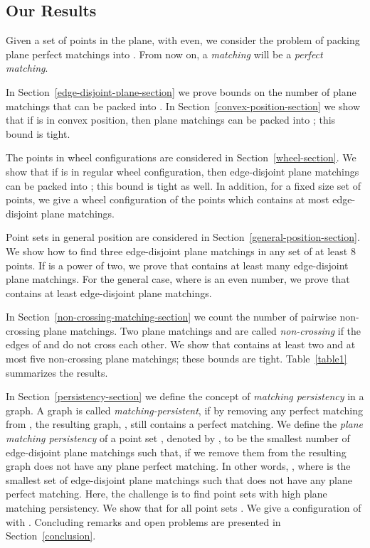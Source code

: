 \documentclass[11pt,a4paper]{article}
\begin{document}
\subsection{Our Results}
\label{our-results-section}

Given a set  of  points in the plane, with  even, we consider the problem of packing plane perfect matchings into . 
From now on, a {\em matching} will be a {\em perfect matching}. 

In Section~\ref{edge-disjoint-plane-section} we prove bounds on the number of plane matchings that can be packed into . 
In Section~\ref{convex-position-section} we show that if  is in convex position, then  plane matchings can be packed into ; this bound is tight. 

The points in wheel configurations are considered in Section~\ref{wheel-section}. We show that if  is in regular wheel configuration, then  edge-disjoint plane matchings can be packed into ; this bound is tight as well. In addition, for a fixed size set of points, we give a wheel configuration of the points which contains at most  edge-disjoint plane matchings. 

Point sets in general position are considered in Section~\ref{general-position-section}. We show how to find three edge-disjoint plane matchings in any set of at least 8 points. If  is a power of two, we prove that  contains at least  many edge-disjoint plane matchings. For the general case, where  is an even number, we prove that  contains at least  edge-disjoint plane matchings. 

In Section~\ref{non-crossing-matching-section} we count the number of pairwise non-crossing plane matchings. Two plane matchings  and  are called {\em non-crossing} if the edges of  and  do not cross each other. We show that  contains at least two and at most five non-crossing plane matchings; these bounds are tight. Table~\ref{table1} summarizes the results. 

In Section~\ref{persistency-section} we define the concept of {\em matching persistency} in a graph. A graph  is called {\em matching-persistent}, if by removing any perfect matching  from , the resulting graph, , still contains a perfect matching. We define the {\em plane matching persistency} of a point set , denoted by , to be the smallest number of edge-disjoint plane matchings such that, if we remove them from  the resulting graph does not have any plane perfect matching. In other words, , where  is the smallest set of edge-disjoint plane matchings such that  does not have any plane perfect matching. Here, the challenge is to find point sets with high plane matching persistency. We show that  for all point sets . We give a configuration of  with . 
Concluding remarks and open problems are presented in Section~\ref{conclusion}.
\end{document}
